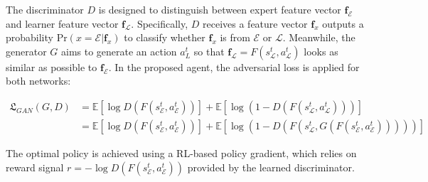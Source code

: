 The discriminator $D$ is designed to distinguish between expert feature vector $\mathbf{f}_\mathcal{E}$ and learner feature vector $\mathbf{f}_\mathcal{L}$.
Specifically,
$D$ receives a feature vector $\mathbf{f}_x$ outputs a probability $\mathrm{Pr}(x=\mathcal{E}|\mathbf{f}_x)$ to classify whether $\mathbf{f}_x$ is from $\mathcal{E}$ or $\mathcal{L}$.
Meanwhile,
the generator $G$ aims to generate an action $a^t_{L}$ so that $\mathbf{f}_\mathcal{L} = F(s^t_\mathcal{L}, a^t_\mathcal{L})$ looks as similar as possible to $\mathbf{f}_\mathcal{E}$.
In the proposed \DAIL{} agent,
the adversarial loss \cite{GAN_Original} is applied for both networks:

\begin{align}
  \mathfrak{L}_{GAN}(G, D) & =
  \mathbb{E}[
    \log{D(F(s^t_\mathcal{E}, a^t_\mathcal{E}))}
  ] + \mathbb{E}[
    \log{(1-D(F(s^t_\mathcal{L}, a^t_\mathcal{L})))}
  ]                                        \\
                           & = \mathbb{E}[
    \log{D(F(s^t_\mathcal{E}, a^t_\mathcal{E}))}
  ] + \mathbb{E}[
    \log{(1-D(F(s^t_\mathcal{L}, G(F(
      s^t_\mathcal{E}, a^t_\mathcal{E}
      )))))}
  ]
\end{align}

The optimal policy is achieved using a RL-based policy gradient,
which relies on reward signal $r=-\log{D(F(s^t_\mathcal{E}, a^t_\mathcal{E}))}$ provided by the learned discriminator.
